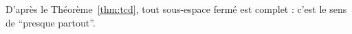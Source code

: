 D'après le Théorème~\ref{thm:tcd}, tout sous-espace fermé est complet : c'est
le sens de \enquote{presque partout}.
